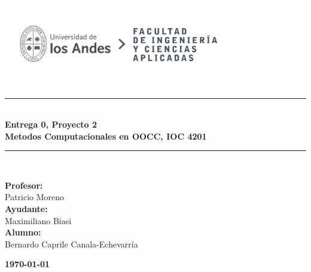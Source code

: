 \documentclass{article}  %
\begin{document}
\begin{titlepage}%
\newcommand{\HRule}{\rule{\linewidth}{0.5mm}} 
\center 
\includegraphics[width=10cm]{LOGO_UNIVERSIDAD.jpg}\\ %
\vspace{3cm}
\HRule \\[0.4cm]
{ \huge \bfseries Entrega 0, Proyecto 2}\\[0.4cm] %
{ \huge \bfseries Metodos Computacionales en OOCC, IOC 4201}\\[0.4cm] %
\HRule \\[1.5cm]
 \vspace{5cm}
\begin{flushright}
    { \textbf{Profesor:}\\
    Patricio Moreno\\
    \vspace{0.2cm}
    \textbf{Ayudante:} \\
    Maximiliano Biasi\\
    \vspace{0.2cm}
    \textbf{Alumno:} \\
    Bernardo Caprile Canala-Echevarría\\

}
\end{flushright}
\vspace{1cm}
{\large \textbf{\today}}\\[1cm] %
\end{titlepage}
\end{document}
